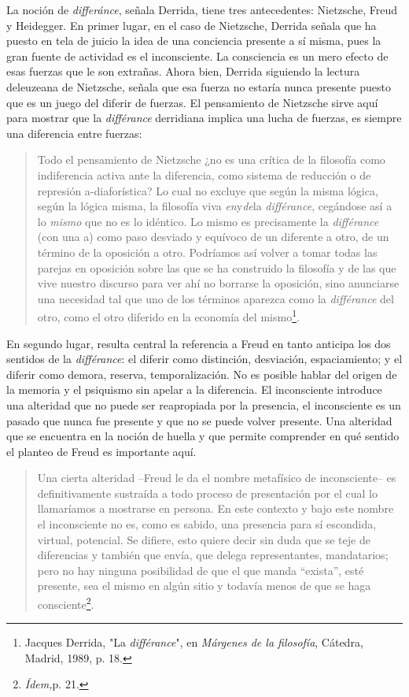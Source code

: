 \documentclass{book}
\begin{document}
La noción de \emph{differánce}, señala Derrida, tiene tres antecedentes:
Nietzsche, Freud y Heidegger. En primer lugar, en el caso de Nietzsche,
Derrida señala que ha puesto en tela de juicio la idea de una conciencia
presente a sí misma, pues la gran fuente de actividad es el
inconsciente. La consciencia es un mero efecto de esas fuerzas que le
son extrañas. Ahora bien, Derrida siguiendo la lectura deleuzeana de
Nietzsche, señala que esa fuerza no estaría nunca presente puesto que es
un juego del diferir de fuerzas. El pensamiento de Nietzsche sirve aquí
para mostrar que la \emph{différance} derridiana implica una lucha de
fuerzas, es siempre una diferencia entre fuerzas:

\begin{quote}
Todo el pensamiento de Nietzsche ¿no es una crítica de la filosofía como
indiferencia activa ante la diferencia, como sistema de reducción o de
represión a-diaforística? Lo cual no excluye que según la misma lógica,
según la lógica misma, la filosofía viva \emph{en}y\emph{de}la
\emph{différance}, cegándose así a lo \emph{mismo} que no es lo
idéntico. Lo mismo es precisamente la \emph{différance} (con una a) como
paso desviado y equívoco de un diferente a otro, de un término de la
oposición a otro. Podríamos así volver a tomar todas las parejas en
oposición sobre las que se ha construido la filosofía y de las que vive
nuestro discurso para ver ahí no borrarse la oposición, sino anunciarse
una necesidad tal que uno de los términos aparezca como la
\emph{différance} del otro, como el otro diferido en la economía del
mismo\footnote{Jacques Derrida, "La \emph{différance}", en
  \emph{Márgenes de la filosofía}, Cátedra, Madrid, 1989, p. 18.}.
\end{quote}

En segundo lugar, resulta central la referencia a Freud en tanto
anticipa los dos sentidos de la \emph{différance}: el diferir como
distinción, desviación, espaciamiento; y el diferir como demora,
reserva, temporalización. No es posible hablar del origen de la memoria
y el psiquismo sin apelar a la diferencia. El inconsciente introduce una
alteridad que no puede ser reapropiada por la presencia, el inconsciente
es un pasado que nunca fue presente y que no se puede volver presente.
Una alteridad que se encuentra en la noción de huella y que permite
comprender en qué sentido el planteo de Freud es importante aquí.

\begin{quote}
Una cierta alteridad --Freud le da el nombre metafísico de
inconsciente-- es definitivamente sustraída a todo proceso de
presentación por el cual lo llamaríamos a mostrarse en persona. En este
contexto y bajo este nombre el inconsciente no es, como es sabido, una
presencia para sí escondida, virtual, potencial. Se difiere, esto quiere
decir sin duda que se teje de diferencias y también que envía, que
delega representantes, mandatarios; pero no hay ninguna posibilidad de
que el que manda ``exista'', esté presente, sea el mismo en algún sitio
y todavía menos de que se haga consciente\footnote{\emph{Ídem,}p. 21.}.
\end{quote}
\end{document}
